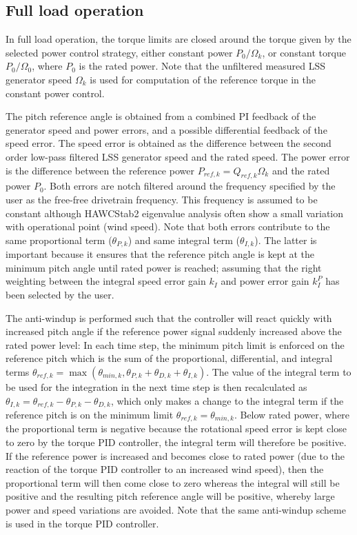 \subsection{Full load operation}

In full load operation, the torque limits are closed around the torque given by the selected power control strategy, either constant power $P_0/\Omega_k$, or constant torque $P_0/\Omega_0$, where $P_0$ is the rated power. Note that the unfiltered measured LSS generator speed $\Omega_k$ is used for computation of the reference torque in the constant power control.

The pitch reference angle is obtained from a combined PI feedback of the generator speed and power errors, and a possible differential feedback of the speed error. The speed error is obtained as the difference between the second order low-pass filtered LSS generator speed and the rated speed. The power error is the difference between the reference power $P_{ref,k}=Q_{ref,k}\Omega_k$ and the rated power $P_0$. Both errors are notch filtered around the frequency specified by the user as the free-free drivetrain frequency. This frequency is assumed to be constant although HAWCStab2 eigenvalue analysis often show a small variation with operational point (wind speed). Note that both errors contribute to the same proportional term ($\theta_{P,k}$) and same integral term ($\theta_{I,k}$). The latter is important because it ensures that the reference pitch angle is kept at the minimum pitch angle until rated power is reached; assuming that the right weighting between the integral speed error gain $k_I$ and power error gain $k_I^P$ has been selected by the user.

The anti-windup is performed such that the controller will react quickly with increased pitch angle if the reference power signal suddenly increased above the rated power level: In each time step, the minimum pitch limit is enforced on the reference pitch which is the sum of the proportional, differential, and integral terms $\theta_{ref,k}=\max\left(\theta_{min,k},\theta_{P,k}+\theta_{D,k}+\theta_{I,k}\right)$. The value of the integral term to be used for the integration in the next time step is then recalculated as $\theta_{I,k}=\theta_{ref,k}-\theta_{P,k}-\theta_{D,k}$, which only makes a change to the integral term if the reference pitch is on the minimum limit $\theta_{ref,k}=\theta_{min,k}$. Below rated power, where the proportional term is negative because the rotational speed error is kept close to zero by the torque PID controller, the integral term will therefore be positive. If the reference power is increased and becomes close to rated power (due to the reaction of the torque PID controller to an increased wind speed), then the proportional term will then come close to zero whereas the integral will still be positive and the resulting pitch reference angle will be positive, whereby large power and speed variations are avoided. Note that the same anti-windup scheme is used in the torque PID controller.

